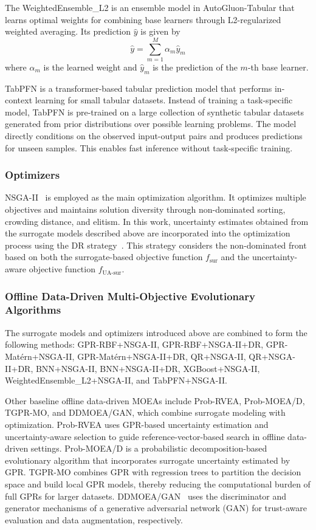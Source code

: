 \documentclass[conference]{IEEEtran}
\begin{document}
The WeightedEnsemble\_L2 is an ensemble model in AutoGluon-Tabular that learns optimal weights for combining base learners through L2-regularized weighted averaging. Its prediction $\hat{y}$ is given by
\begin{equation}
\hat{y} = \sum_{m=1}^M \alpha_m \hat{y}_{m}
\end{equation}
where $\alpha_m$ is the learned weight and $\hat{y}_{m}$ is the prediction of the $m$-th base learner.

TabPFN is a transformer-based tabular prediction model that performs in-context learning for small tabular datasets. Instead of training a task-specific model, TabPFN is pre-trained on a large collection of synthetic tabular datasets generated from prior distributions over possible learning problems. The model directly conditions on the observed input-output pairs and produces predictions for unseen samples. This enables fast inference without task-specific training. 

\subsubsection{Optimizers}
\gls{NSGA-II}~\cite{nsga_ii} is employed as the main optimization algorithm. It optimizes multiple objectives and maintains solution diversity through non-dominated sorting, crowding distance, and elitism. In this work, uncertainty estimates obtained from the surrogate models described above are incorporated into the optimization process using the \gls{DR} strategy~\cite{lyu_dual_ranking}. This strategy considers the non-dominated front based on both the surrogate-based objective function $f_{\text{sur}}$ and the uncertainty-aware objective function $f_{\text{UA-sur}}$.


\subsubsection{Offline Data-Driven Multi-Objective Evolutionary Algorithms}
The surrogate models and optimizers introduced above are combined to form the following methods: GPR-RBF+NSGA-II, GPR-RBF+NSGA-II+DR, GPR-Mat\'ern+NSGA-II, GPR-Mat\'ern+NSGA-II+DR, QR+NSGA-II, QR+NSGA-II+DR, BNN+NSGA-II, BNN+NSGA-II+DR, XGBoost+NSGA-II, WeightedEnsemble\_L2+NSGA-II, and TabPFN+NSGA-II.

Other baseline offline data-driven \gls{MOEAs} include Prob-RVEA, Prob-MOEA/D, TGPR-MO, and DDMOEA/GAN, which combine surrogate modeling with optimization. Prob-RVEA uses GPR-based uncertainty estimation and uncertainty-aware selection to guide reference-vector-based search in offline data-driven settings. Prob-MOEA/D is a probabilistic decomposition-based evolutionary algorithm that incorporates surrogate uncertainty estimated by GPR. TGPR-MO combines GPR with regression trees to partition the decision space and build local GPR models, thereby reducing the computational burden of full GPRs for larger datasets. DDMOEA/GAN~\cite{ddea_gan} uses the discriminator and generator mechanisms of a generative adversarial network (GAN) for trust-aware evaluation and data augmentation, respectively.
\end{document}
